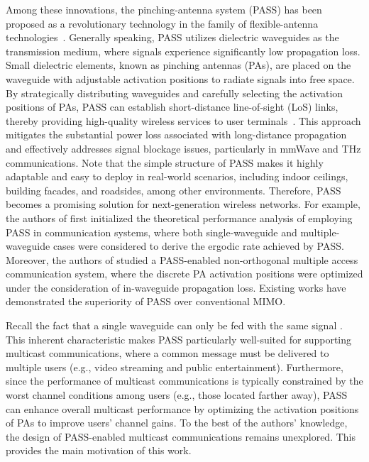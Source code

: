 \documentclass[summary]{ursi}
\begin{document}
Among these innovations, the pinching-antenna system (PASS) has been proposed as a revolutionary technology in the family of flexible-antenna technologies~\cite{DOCOMO}. Generally speaking, PASS utilizes dielectric waveguides as the transmission medium, where signals experience significantly low propagation loss. Small dielectric elements, known as pinching antennas (PAs), are placed on the waveguide with adjustable activation positions to radiate signals into free space. By strategically distributing waveguides and carefully selecting the activation positions of PAs, PASS can establish short-distance line-of-sight (LoS) links, thereby providing high-quality wireless services to user terminals~\cite{PASS}. This approach mitigates the substantial power loss associated with long-distance propagation and effectively addresses signal blockage issues, particularly in mmWave and THz communications. Note that the simple structure of PASS makes it highly adaptable and easy to deploy in real-world scenarios, including indoor ceilings, building facades, and roadsides, among other environments. Therefore, PASS becomes a promising solution for next-generation wireless networks. For example, the authors of \cite{Ding} first initialized the theoretical performance analysis of employing PASS in communication systems, where both single-waveguide and multiple-waveguide cases were considered to derive the ergodic rate achieved by PASS. Moreover, the authors of \cite{Kaidi} studied a PASS-enabled non-orthogonal multiple access communication system, where the discrete PA activation positions were optimized under the consideration of in-waveguide propagation loss. Existing works have demonstrated the superiority of PASS over conventional MIMO.

Recall the fact that a single waveguide can only be fed with the same signal \cite{PASS,Ding,Kaidi}. This inherent characteristic makes PASS particularly well-suited for supporting multicast communications, where a common message must be delivered to multiple users (e.g., video streaming and public entertainment). Furthermore, since the performance of multicast communications is typically constrained by the worst channel conditions among users (e.g., those located farther away), PASS can enhance overall multicast performance by optimizing the activation positions of PAs to improve users' channel gains. To the best of the authors' knowledge, the design of PASS-enabled multicast communications remains unexplored. This provides the main motivation of this work.
\end{document}
